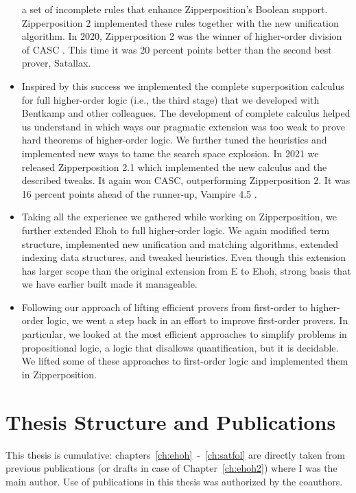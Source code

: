 \begin{itemize}
  a set of incomplete rules that enhance Zipperposition's Boolean support.
  Zipperposition 2 implemented these rules together with the new unification
  algorithm. In 2020, Zipperposition 2 was the winner of higher-order division
  of CASC \cite{gs-21-cascj10}. This time it was 20 percent points better than the second best
  prover, Satallax.
  \item Inspired by this success we implemented the complete superposition
  calculus for full higher-order logic (i.e., the third stage) that we developed with Bentkamp and other
  colleagues. The development of complete calculus helped us understand in which
  ways our pragmatic extension was too weak to prove hard theorems of
  higher-order logic. We further tuned the heuristics and implemented new ways
  to tame the search space explosion. In 2021 we released Zipperposition 2.1
  which implemented the new calculus and the described tweaks. It again won
  CASC, outperforming Zipperposition 2. It was 16 percent points ahead of the
  runner-up, Vampire 4.5 \cite{lkav-13-vampire}. 

  \item Taking all the experience we gathered while working on Zipperposition,
  we further extended Ehoh to full higher-order logic. We again modified term
  structure, implemented new unification and matching algorithms, extended indexing data
  structures, and tweaked heuristics. Even though this extension has larger scope than 
  the original extension from E to Ehoh, strong basis that we have earlier built
  made it manageable.

  \item Following our approach of lifting efficient provers from
  first-order to higher-order logic, we went a step back in an effort to improve
  first-order provers. In particular, we looked at the most efficient approaches
  to simplify problems in propositional logic, a logic that disallows quantification,
  but it is decidable. We lifted some of these approaches to first-order logic
  and implemented them in Zipperposition. 
\end{itemize}

\section{Thesis Structure and Publications}

This thesis is cumulative: chapters~\ref{ch:ehoh}~-~\ref{ch:satfol}  are
directly taken from previous publications (or drafts in case of
Chapter~\ref{ch:ehoh2}) where I was the main author. Use
of publications in this thesis was authorized by the coauthors. 


